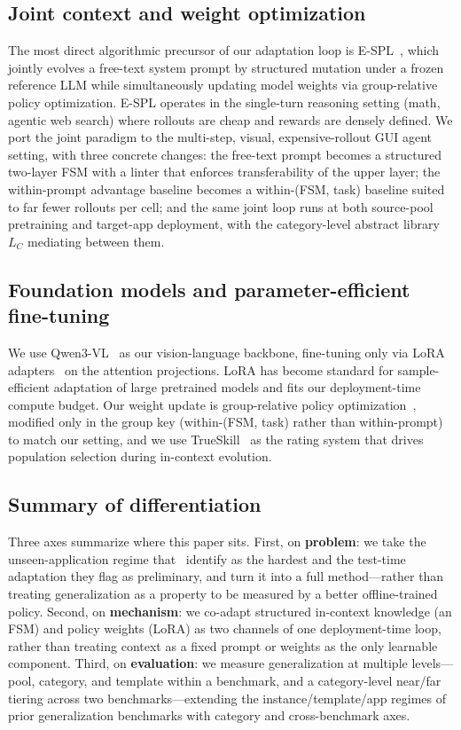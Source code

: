 \subsection{Joint context and weight optimization}

The most direct algorithmic precursor of our adaptation loop is
E-SPL~\citep{zhang2026espl}, which jointly evolves a free-text system prompt by
structured mutation under a frozen reference LLM while simultaneously updating
model weights via group-relative policy optimization. E-SPL operates in the
single-turn reasoning setting (math, agentic web search) where rollouts are cheap
and rewards are densely defined. We port the joint paradigm to the multi-step,
visual, expensive-rollout GUI agent setting, with three concrete changes: the
free-text prompt becomes a structured two-layer FSM with a linter that enforces
transferability of the upper layer; the within-prompt advantage baseline becomes
a within-(FSM, task) baseline suited to far fewer rollouts per cell; and the same
joint loop runs at both source-pool pretraining and target-app deployment, with
the category-level abstract library $L_C$ mediating between them.

\subsection{Foundation models and parameter-efficient fine-tuning}

We use Qwen3-VL~\citep{qwen3vl2025} as our vision-language backbone, fine-tuning
only via LoRA adapters~\citep{hu2021lora} on the attention projections. LoRA has
become standard for sample-efficient adaptation of large pretrained models and
fits our deployment-time compute budget. Our weight update is group-relative
policy optimization~\citep{shao2024deepseekmath}, modified only in the group key
(within-(FSM, task) rather than within-prompt) to match our setting, and we use
TrueSkill~\citep{herbrich2007trueskill} as the rating system that drives
population selection during in-context evolution.

\subsection{Summary of differentiation}

Three axes summarize where this paper sits. First, on \textbf{problem}: we take
the unseen-application regime that~\citet{gu2026generalization} identify as the
hardest and the test-time adaptation they flag as preliminary, and turn it into a
full method---rather than treating generalization as a property to be measured by
a better offline-trained policy. Second, on \textbf{mechanism}: we co-adapt
structured in-context knowledge (an FSM) and policy weights (LoRA) as two
channels of one deployment-time loop, rather than treating context as a fixed
prompt or weights as the only learnable component. Third, on \textbf{evaluation}:
we measure generalization at multiple levels---pool, category, and template
within a benchmark, and a category-level near/far tiering across two
benchmarks---extending the instance/template/app regimes of prior generalization
benchmarks with category and cross-benchmark axes.
